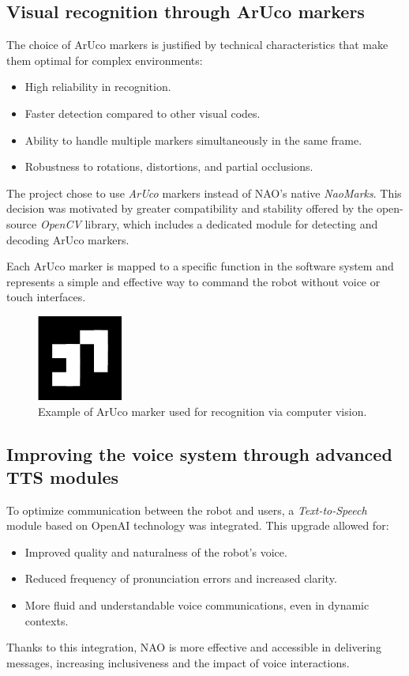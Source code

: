 \documentclass{optica-article}
\begin{document}
\subsection{Visual recognition through ArUco markers}
The choice of ArUco markers is justified by technical characteristics that make them optimal for complex environments:
\begin{itemize}
    \item High reliability in recognition.
    \item Faster detection compared to other visual codes.
    \item Ability to handle multiple markers simultaneously in the same frame.
    \item Robustness to rotations, distortions, and partial occlusions.
\end{itemize}
The project chose to use \textit{ArUco} markers instead of NAO’s native \textit{NaoMarks}. This decision was motivated by greater compatibility and stability offered by the open-source \textit{OpenCV} library, which includes a dedicated module for detecting and decoding ArUco markers.

Each ArUco marker is mapped to a specific function in the software system and represents a simple and effective way to command the robot without voice or touch interfaces.

\begin{figure}[h!]
    \centering
    \includegraphics[width=0.25\textwidth]{figures/aruco.png}
    \caption{Example of ArUco marker used for recognition via computer vision.}
    \label{fig:aruco_marker}
\end{figure}

\subsection{Improving the voice system through advanced TTS modules}
To optimize communication between the robot and users, a \textit{Text-to-Speech} module based on OpenAI technology was integrated. This upgrade allowed for:
\begin{itemize}
    \item Improved quality and naturalness of the robot’s voice.
    \item Reduced frequency of pronunciation errors and increased clarity.
    \item More fluid and understandable voice communications, even in dynamic contexts.
\end{itemize}
Thanks to this integration, NAO is more effective and accessible in delivering messages, increasing inclusiveness and the impact of voice interactions.
\end{document}
